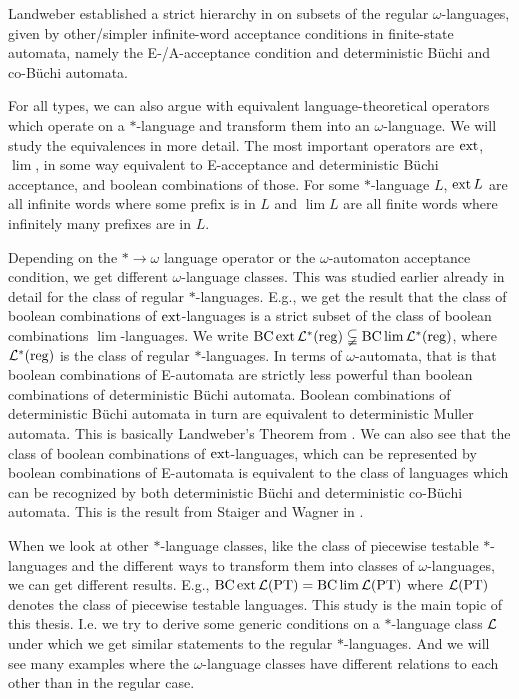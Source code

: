 Landweber established a strict hierarchy in \cite{Landweber69} on subsets of the regular $\omega$-languages, given by other/simpler infinite-word acceptance conditions in finite-state automata, namely the E-/A-acceptance condition and deterministic Büchi and co-Büchi automata.

For all types, we can also argue with equivalent language-theoretical operators which operate on a $*$-language and transform them into an $\omega$-language. We will study the equivalences in more detail. The most important operators are $\operatorname{ext}$, $\lim$, in some way equivalent to E-acceptance and deterministic Büchi acceptance, and boolean combinations of those. For some $*$-language $L$, $\operatorname{ext} L$ are all infinite words where some prefix is in $L$ and $\lim L$ are all finite words where infinitely many prefixes are in $L$.

Depending on the $* \rightarrow \omega$ language operator or the $\omega$-automaton acceptance condition, we get different $\omega$-language classes. This was studied earlier already in detail for the class of regular $*$-languages. E.g., we get the result that the class of boolean combinations of $\operatorname{ext}$-languages is a strict subset of the class of boolean combinations $\lim$-languages. We write $\operatorname{BC} \operatorname{ext} \mathcal{L}^*(\textup{\textrm{reg}}) \subsetneqq \operatorname{BC} \lim \mathcal{L}^*(\textup{\textrm{reg}})$, where $\mathcal{L}^*(\textup{\textrm{reg}})$ is the class of regular $*$-languages. In terms of $\omega$-automata, that is that boolean combinations of E-automata are strictly less powerful than boolean combinations of deterministic Büchi automata. Boolean combinations of deterministic Büchi automata in turn are equivalent to deterministic Muller automata. This is basically Landweber's Theorem from \cite{Landweber69}. We can also see that the class of boolean combinations of $\operatorname{ext}$-languages, which can be represented by boolean combinations of E-automata is equivalent to the class of languages which can be recognized by both deterministic Büchi and deterministic co-Büchi automata. This is the result from Staiger and Wagner in \cite{StaigerW74}.

When we look at other $*$-language classes, like the class of piecewise testable $*$-languages and the different ways to transform them into classes of $\omega$-languages, we can get different results. E.g., $\operatorname{BC} \operatorname{ext} \mathcal{L}(\textup{\textrm{PT}}) = \operatorname{BC} \lim \mathcal{L}(\textup{\textrm{PT}})$ where $\mathcal{L}(\textup{\textrm{PT}})$ denotes the class of piecewise testable languages. This study is the main topic of this thesis. I.e. we try to derive some generic conditions on a $*$-language class $\mathcal{L}$ under which we get similar statements to the regular $*$-languages. And we will see many examples where the $\omega$-language classes have different relations to each other than in the regular case.

